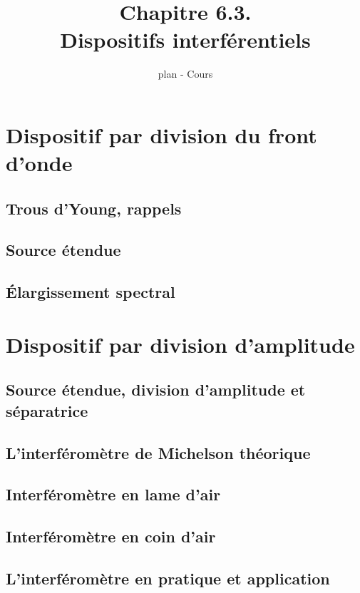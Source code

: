 \documentclass[french]{article}
\begin{document}
	
\title{Chapitre 6.3. \\
Dispositifs interférentiels}
\author{plan - Cours}
\date{}
	
\maketitle

\section{Dispositif par division du front d'onde}

\subsection{Trous d'Young, rappels}

\subsection{Source étendue}

\subsection{Élargissement spectral}

\section{Dispositif par division d'amplitude}

\subsection{Source étendue, division d'amplitude et séparatrice}

\subsection{L'interféromètre de Michelson théorique}

\subsection{Interféromètre en lame d'air}

\subsection{Interféromètre en coin d'air}

\subsection{L'interféromètre en pratique et application}
\end{document}
